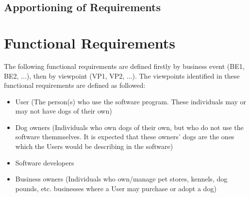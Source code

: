 \documentclass[]{article}
\begin{document}
\subsection{Apportioning of Requirements}
\label{sub:apportioning_of_requirements}



\section{Functional Requirements}
\label{sec:functional_requirements}
The following functional requirements are defined firstly by business event (BE1, BE2, ...), then by viewpoint (VP1, VP2, ...). The viewpoints identified in these functional requirements are defined as followed:
\begin{itemize}
\item User (The person(s) who use the software program. These individuals may or may not have dogs of their own)
\item Dog owners (Individuals who own dogs of their own, but who do not use the software themmselves. It is expected that these owners' dogs are the ones which the Users would be describing in the software)
\item Software developers 
\item Business owners (Individuals who own/manage pet stores, kennels, dog pounds, etc. businesses where a User may purchase or adopt a dog)
\end{itemize}
\end{document}
